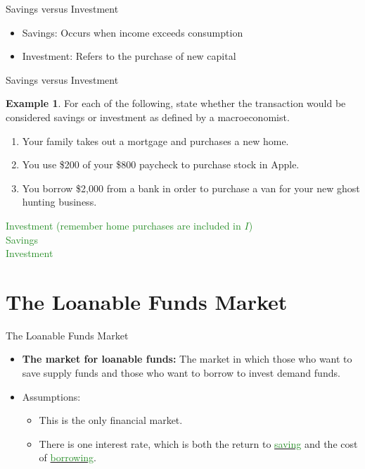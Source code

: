 \documentclass[xcolor={dvipsnames},pdf, hyperref={colorlinks=true, citecolor=ForestGreen, linkcolor=BlueViolet, urlcolor=Magenta}]{beamer}
\theoremstyle{definition}
\newtheorem{exmp}{Example}[section]
\newcommand{\defn}[1]{\textbf{#1}}
\newcommand{\ddp}[1]{{\textcolor{ForestGreen}{#1}}}
\newcommand{\dd}[1]{{\underline{\textcolor{ForestGreen}{#1}}}}
\begin{document}
\begin{frame}{Savings versus Investment}
\begin{itemize}
		\item Savings: Occurs when income exceeds consumption
		\item Investment: Refers to the purchase of new capital
	\end{itemize}
\end{frame}

\begin{frame}{Savings versus Investment}

\begin{exmp} For each of the following, state whether the transaction would be considered savings or investment as defined by a macroeconomist.
	\begin{enumerate}
		\item Your family takes out a mortgage and purchases a new home.
		\item You use \$200 of your \$800 paycheck to purchase stock in Apple.
		\item You borrow \$2,000 from a bank in order to purchase a van for your new ghost hunting business. 
	\end{enumerate}
\end{exmp}

\ddp{\pause Investment (remember home purchases are included in $I$) \\
\pause Savings \\
Investment}
\end{frame}

\section{The Loanable Funds Market}

\begin{frame}{The Loanable Funds Market}
\begin{itemize}
	\item \defn{The market for loanable funds:} The market in which those who want to save supply funds and those who want to borrow to invest demand funds.
	\item Assumptions:
	\begin{itemize}
		\item This is the only financial market.
		\item There is one interest rate, which is both the return to \dd{saving} and the cost of \dd{borrowing}.
	\end{itemize}
\end{itemize}
\end{frame}
\end{document}
